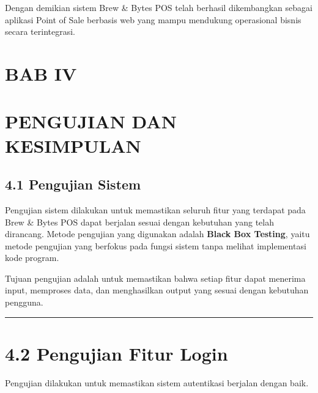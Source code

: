 Dengan demikian sistem Brew \& Bytes POS telah berhasil dikembangkan sebagai aplikasi Point of Sale berbasis web yang mampu mendukung operasional bisnis secara terintegrasi.

\section{BAB IV}\label{bab-iv}

\section{PENGUJIAN DAN KESIMPULAN}\label{pengujian-dan-kesimpulan}

\subsection{4.1 Pengujian Sistem}\label{pengujian-sistem}

Pengujian sistem dilakukan untuk memastikan seluruh fitur yang terdapat pada Brew \& Bytes POS dapat berjalan sesuai dengan kebutuhan yang telah dirancang. Metode pengujian yang digunakan adalah \textbf{Black Box Testing}, yaitu metode pengujian yang berfokus pada fungsi sistem tanpa melihat implementasi kode program.

Tujuan pengujian adalah untuk memastikan bahwa setiap fitur dapat menerima input, memproses data, dan menghasilkan output yang sesuai dengan kebutuhan pengguna.

\begin{center}\rule{0.5\linewidth}{0.5pt}\end{center}

\section{4.2 Pengujian Fitur Login}\label{pengujian-fitur-login}

Pengujian dilakukan untuk memastikan sistem autentikasi berjalan dengan baik.

